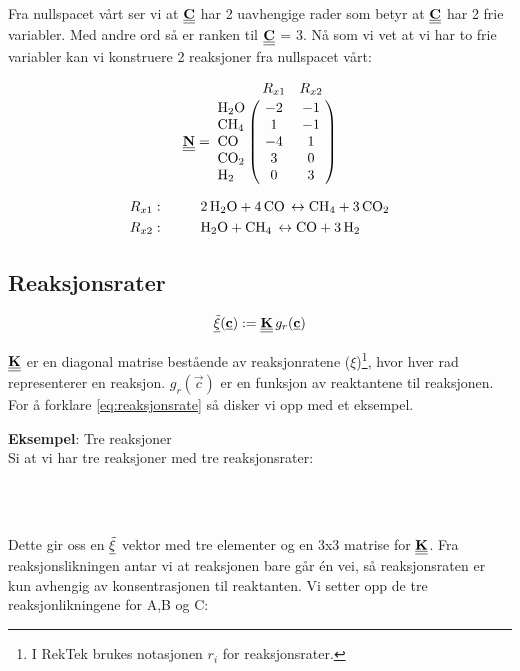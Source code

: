 Fra nullspacet vårt ser vi at $\underline{\underline{\textbf{C}}}$ har 2 uavhengige rader som betyr at $\underline{\underline{\textbf{C}}}$ har 2 frie variabler. Med andre ord så er ranken til $\underline{\underline{\textbf{C}}}$ = 3. Nå som vi vet at vi har to frie variabler kan vi konstruere 2 reaksjoner fra nullspacet vårt:

\begin{equation}
    \mymat{N} = 
    \bordermatrix{~ & R_{x1} & R_{x2}   \cr
                  \ce{H2O} & -2 & -1  \cr
                  \ce{CH4} & 1 & -1 \cr
                  \ce{CO} & -4 & 1 \cr
                  \ce{CO2} & 3 & 0 \cr
                  \ce{H2} & 0 & 3
                  }
\end{equation}

\begin{align*}
    R_{x1}:&\hspace{1cm} \ce{2H2O + 4CO \leftrightarrow CH4 + 3CO2} \\
    R_{x2}:&\hspace{1cm} \ce{H2O + CH4 \leftrightarrow CO + 3H2}
\end{align*}


\subsection{Reaksjonsrater}
\begin{equation}
    \label{eq:reaksjonsrate}
    \underline{\Tilde{\xi}}(\underline{\textbf{c}}) := \underline{\underline{\textbf{K}}}\,g_r(\underline{\textbf{c}})
\end{equation}

$\underline{\underline{\textbf{K}}}$ er en diagonal matrise bestående av reaksjonratene ($\xi$)\footnote{I RekTek brukes notasjonen $r_i$ for reaksjonsrater.}, hvor hver rad representerer en reaksjon. $g_r(\vec{c})$ er en funksjon av reaktantene til reaksjonen. For å forklare \cref{eq:reaksjonsrate} så disker vi opp med et eksempel. 

\textbf{Eksempel}: Tre reaksjoner\\
Si at vi har tre reaksjoner med tre reaksjonsrater:
\begin{center}
    \\
    \\
\end{center}

Dette gir oss en $\underline{\Tilde{\xi}}$ vektor med tre elementer og en 3x3 matrise for $\underline{\underline{\textbf{K}}}$. Fra reaksjonslikningen antar vi at reaksjonen bare går én vei, så reaksjonsraten er kun avhengig av konsentrasjonen til reaktanten. Vi setter opp de tre reaksjonlikningene for A,B og C:

